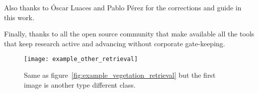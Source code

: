 \documentclass[conference]{IEEEtran}
\begin{document}
    Also thanks to Óscar Luaces and Pablo Pérez for the corrections and guide in this work.

    Finally, thanks to all the open source community that make available all the tools that keep research active and advancing without corporate gate-keeping.




    \begin{figure}[t]
        \centering
        \texttt{[image: example\_other\_retrieval]}
        \caption{Same as figure~\ref{fig:example_vegetation_retrieval} but the first image is another type different class.}
        \label{fig:example_other_retrieval}
    \end{figure}
    
\end{document}
